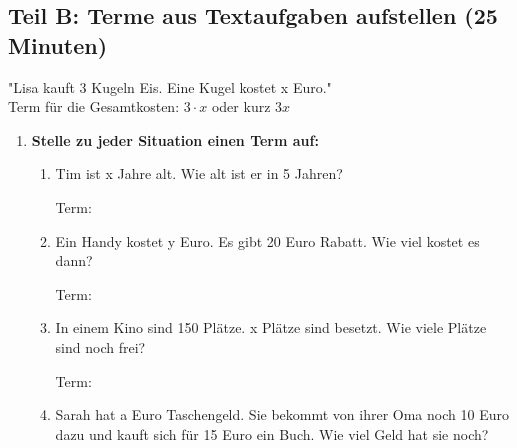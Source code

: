 \subsection*{Teil B: Terme aus Textaufgaben aufstellen (25 Minuten)}

\begin{beispielbox}[Beispiel]
"Lisa kauft 3 Kugeln Eis. Eine Kugel kostet x Euro."\\
Term für die Gesamtkosten: $3 \cdot x$ oder kurz $3x$
\end{beispielbox}

\begin{enumerate}[label=\arabic*., resume]

    \item \textbf{Stelle zu jeder Situation einen Term auf:}

    \vspace{0.5cm}

    \begin{enumerate}[label=\alph*)]
        \item Tim ist x Jahre alt. Wie alt ist er in 5 Jahren?
        \vspace{0.3cm}

        Term: \underline{\hspace{4cm}}

        \vspace{0.5cm}

        \item Ein Handy kostet y Euro. Es gibt 20 Euro Rabatt. Wie viel kostet es dann?
        \vspace{0.3cm}

        Term: \underline{\hspace{4cm}}

        \vspace{0.5cm}

        \item In einem Kino sind 150 Plätze. x Plätze sind besetzt. Wie viele Plätze sind noch frei?
        \vspace{0.3cm}

        Term: \underline{\hspace{4cm}}

        \vspace{0.5cm}

        \item Sarah hat a Euro Taschengeld. Sie bekommt von ihrer Oma noch 10 Euro dazu und kauft sich für 15 Euro ein Buch. Wie viel Geld hat sie noch?
        \vspace{0.3cm}


\end{enumerate}
\end{enumerate}
